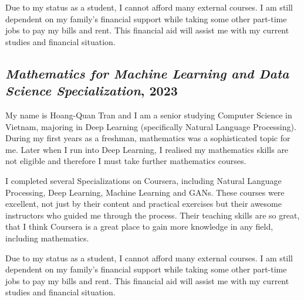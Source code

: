 Due to my status as a student, I cannot afford many external courses. I am still dependent on my family's financial support while taking some other part-time jobs to pay my bills and rent. This financial aid will assist me with my current studies and financial situation.

\subsection{\textit{Mathematics for Machine Learning and Data Science Specialization}, 2023}
My name is Hoang-Quan Tran and I am a senior studying Computer Science in Vietnam, majoring in Deep Learning (specifically Natural Language Processing). During my first years as a freshman, mathematics was a sophisticated topic for me. Later when I run into Deep Learning, I realised my mathematics skills are not eligible and therefore I must take further mathematics courses.

I completed several Specializations on Coursera, including Natural Language Processing, Deep Learning, Machine Learning and GANs. These courses were excellent, not just by their content and practical exercises but their awesome instructors who guided me through the process. Their teaching skills are so great, that I think Coursera is a great place to gain more knowledge in any field, including mathematics.

Due to my status as a student, I cannot afford many external courses. I am still dependent on my family's financial support while taking some other part-time jobs to pay my bills and rent. This financial aid will assist me with my current studies and financial situation.